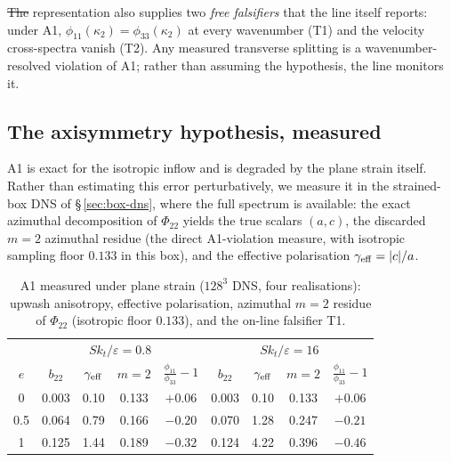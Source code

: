 \documentclass[lineno]{JFM-FLM_Au}
\providecommand{\DIFadd}[1]{{\protect\color{blue}\uwave{#1}}} %
\providecommand{\DIFdel}[1]{{\protect\color{red}\sout{#1}}} %
\providecommand{\DIFaddbegin}{} %
\providecommand{\DIFaddend}{} %
\providecommand{\DIFdelbegin}{} %
\providecommand{\DIFdelend}{} %
\begin{document}
\DIFdelbegin \DIFdel{The }\DIFdelend \DIFaddbegin \DIFadd{As showm in Appenix~\ref{app:forward}, the }\DIFaddend representation also supplies two \emph{free falsifiers} that the line
itself reports: under A1, $\phi_{11}(\kappa_2)=\phi_{33}(\kappa_2)$ at
every wavenumber (T1) and the velocity cross-spectra vanish (T2). Any
measured transverse splitting is a wavenumber-resolved violation of A1;
rather than assuming the hypothesis, the line monitors it.

\subsection{The axisymmetry hypothesis, measured}\label{sec:a1meas}

A1 is exact for the isotropic inflow and is degraded by the plane strain
itself. Rather than estimating this error perturbatively, we measure it in
the strained-box DNS of \S\,\ref{sec:box-dns}, where the full spectrum is
available: the exact azimuthal decomposition of $\Phi_{22}$ yields the true
scalars $(a,c)$, the discarded $m=2$ azimuthal residue (the direct
A1-violation measure, with isotropic sampling floor $0.133$ in this box),
and the effective polarisation $\gamma_{\rm eff}=|c|/a$.

\begin{table}
  \centering\small
  \begin{tabular}{c|cccc|cccc}
  & \multicolumn{4}{c|}{$Sk_t/\varepsilon=0.8$} & \multicolumn{4}{c}{$Sk_t/\varepsilon=16$}\\
  $e$ & $b_{22}$ & $\gamma_{\rm eff}$ & $m{=}2$ & $\tfrac{\phi_{11}}{\phi_{33}}{-}1$
      & $b_{22}$ & $\gamma_{\rm eff}$ & $m{=}2$ & $\tfrac{\phi_{11}}{\phi_{33}}{-}1$\\[1pt]
  0    & 0.003 & 0.10 & 0.133 & $+0.06$ & 0.003 & 0.10 & 0.133 & $+0.06$\\
  0.5  & 0.064 & 0.79 & 0.166 & $-0.20$ & 0.070 & 1.28 & 0.247 & $-0.21$\\
  1    & 0.125 & 1.44 & 0.189 & $-0.32$ & 0.124 & 4.22 & 0.396 & $-0.46$\\
  \end{tabular}
  \caption{A1 measured under plane strain ($128^3$ DNS, four realisations):
  upwash anisotropy, effective polarisation, azimuthal $m=2$ residue of
  $\Phi_{22}$ (isotropic floor $0.133$), and the on-line falsifier T1.}
  \label{tab:a1meas}
\end{table}
\end{document}
